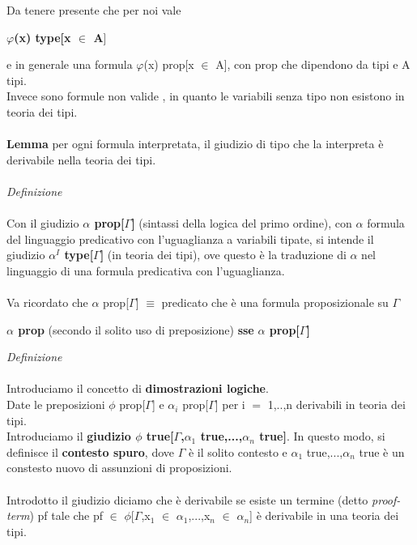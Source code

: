 \noindent
Da tenere presente che per noi vale
\begin{center}\textbf{$\varphi$(x) type[x $\in$ A}]\end{center}
e in generale una formula $\varphi$(x) prop[x $\in$ A], con prop che dipendono da tipi e A tipi.\\
Invece sono formule non valide
 , 
in quanto le variabili senza tipo non esistono in teoria dei tipi.\\\\
\noindent
\textbf{Lemma} per ogni formula interpretata, il giudizio di tipo che la interpreta \`e derivabile nella teoria dei tipi.\\\\
\noindent
\textit{Definizione}\\\\
\noindent
Con il giudizio \textbf{$\alpha$ prop[$\Gamma$]} (sintassi della logica del primo ordine), con $\alpha$ formula del linguaggio predicativo con l'uguaglianza a variabili tipate,
si intende il giudizio \textbf{$\alpha^I$ type[$\Gamma$]} (in teoria dei tipi), ove questo \`e la traduzione di $\alpha$ nel linguaggio di una formula predicativa con l'uguaglianza.\\\\
\noindent
Va ricordato che $\alpha$ prop[$\Gamma$] $\equiv$ predicato che \`e una formula proposizionale su $\Gamma$
\begin{center}
\textbf{$\alpha$ prop} (secondo il solito uso di preposizione) \quad \textbf{sse} \quad \textbf{$\alpha$ prop[$\Gamma$]}
\end{center}
\vspace{0.3cm}
\textit{Definizione}\\\\
\noindent
Introduciamo il concetto di \textbf{dimostrazioni logiche}.\\
Date le preposizioni $\phi$ prop[$\Gamma$] e $\alpha_i$ prop[$\Gamma$] per i $=$ 1,..,n derivabili in teoria dei tipi.\\
Introduciamo il \textbf{giudizio $\phi$ true[$\Gamma$,$\alpha_1$ true,...,$\alpha_n$ true]}. In questo modo, si definisce il \textbf{contesto spuro}, dove $\Gamma$ \`e il solito contesto e $\alpha_1$ true,...,$\alpha_n$ true \`e un constesto nuovo di assunzioni di proposizioni.\\\\
\noindent
Introdotto il giudizio diciamo che \`e derivabile se esiste un termine (detto \textit{proof-term}) pf tale che pf $\in$ $\phi$[$\Gamma$,x$_1$ $\in$ $\alpha_1$,...,x$_n$ $\in$ $\alpha_n$] \`e derivabile in una teoria dei tipi.\\\\
